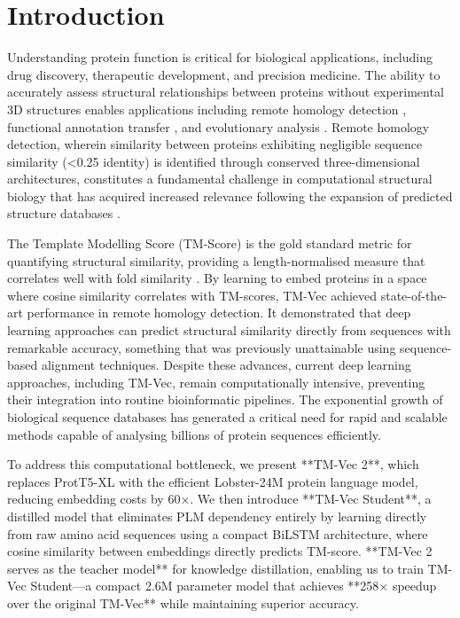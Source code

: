\documentclass[runningheads]{llncs}
\begin{document}

\section{Introduction}

Understanding protein function is critical for biological applications, including drug discovery, therapeutic development, and precision medicine. The ability to accurately assess structural relationships between proteins without experimental 3D structures enables applications including remote homology detection \cite{hamamsy2024protein}, functional annotation transfer \cite{koestler2010fact}, and evolutionary analysis \cite{fares2006caps}. Remote homology detection, wherein similarity between proteins exhibiting negligible sequence similarity (\textless 0.25 identity) is identified through conserved three-dimensional architectures, constitutes a fundamental challenge in computational structural biology that has acquired increased relevance following the expansion of predicted structure databases \cite{kilinc2025major}.

The Template Modelling Score (TM-Score) is the gold standard metric for quantifying structural similarity, providing a length-normalised measure that correlates well with fold similarity \cite{zhang2005tm}. 
By learning to embed proteins in a space where cosine similarity correlates with TM-scores, TM-Vec \cite{hamamsy2024protein} achieved state-of-the-art performance in remote homology detection. It demonstrated that deep learning approaches can predict structural similarity directly from sequences with remarkable accuracy, something that was previously unattainable using sequence-based alignment techniques. Despite these advances, current deep learning approaches, including TM-Vec, remain computationally intensive, preventing their integration into routine bioinformatic pipelines. The exponential growth of biological sequence databases has generated a critical need for rapid and scalable methods capable of analysing billions of protein sequences efficiently.  

To address this computational bottleneck, we present **TM-Vec 2**, which replaces ProtT5-XL with the efficient Lobster-24M protein language model, reducing embedding costs by 60×. We then introduce **TM-Vec Student**, a distilled model that eliminates PLM dependency entirely by learning directly from raw amino acid sequences using a compact BiLSTM architecture, where cosine similarity between embeddings directly predicts TM-score. **TM-Vec 2 serves as the teacher model** for knowledge distillation, enabling us to train TM-Vec Student—a compact 2.6M parameter model that achieves **258× speedup over the original TM-Vec** while maintaining superior accuracy.
\end{document}
